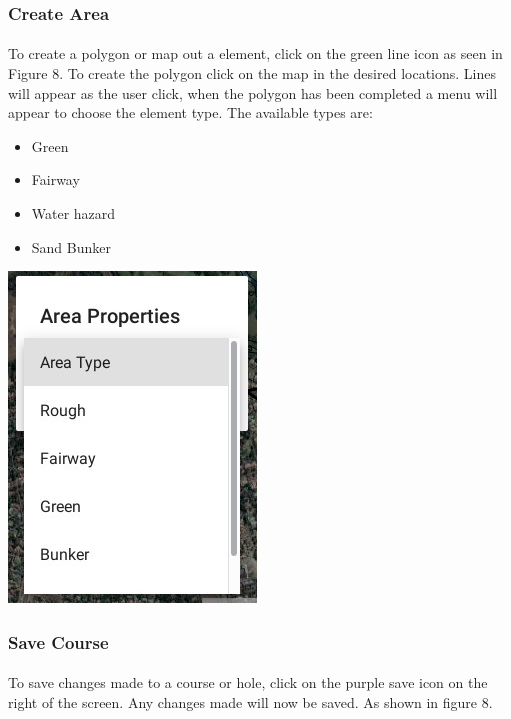\documentclass{article}
\begin{document}
	\subsubsection{Create Area}
    \paragraph{}
    To create a polygon or map out a element, click on the green line icon as seen in Figure 8. To create the polygon click on the map in the desired locations. Lines will appear as the user click, when the polygon has been completed a menu will appear to choose the element type. The available types are: 
    
    \begin{itemize}
     \item Green
     \item Fairway
     \item Water hazard
     \item Sand Bunker
    \end{itemize}
    
    \includegraphics[scale=1.5]{10_area}
    
     \subsubsection{Save Course} 
    \paragraph{}
    To save changes made to a course or hole, click on the purple save icon on the right of the screen. Any changes made will now be saved. As shown in figure 8.
    
\end{document}
